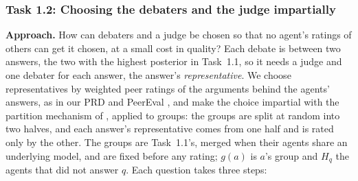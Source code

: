 \documentclass[12pt,letterpaper]{article}
\newcommand{\hd}[1]{\ifhmode\par\fi\addvspace{1pt}\noindent\textbf{#1}\hspace{0.35em}}
\begin{document}
\subsubsection{Task 1.2: Choosing the debaters and the judge impartially}\label{sec:t12}
\hd{Approach.} How can debaters and a judge be chosen so that no agent's ratings of others can get it chosen, at a small cost in quality? Each debate is between two answers, the two with the highest posterior in Task~1.1, so it needs a judge and one debater for each answer, the answer's \emph{representative}. We choose representatives by weighted peer ratings of the arguments behind the agents' answers, as in our PRD and PeerEval \citep{li2024prd}, and make the choice impartial with the partition mechanism of \citet{alon2011sum}, applied to groups: the groups are split at random into two halves, and each answer's representative comes from one half and is rated only by the other. The groups are Task~1.1's, merged when their agents share an underlying model, and are fixed before any rating; $g(a)$ is $a$'s group and $H_q$ the agents that did not answer $q$. Each question takes three steps:
\end{document}
